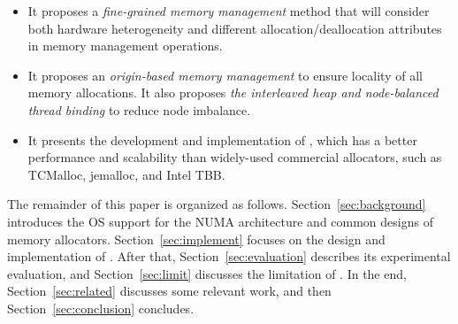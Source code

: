 \begin{itemize}

\item It proposes a \textit{fine-grained memory management} method that will consider both hardware heterogeneity and different allocation/deallocation attributes in memory management operations.

\item It proposes an \textit{origin-based memory management} to ensure locality of all memory allocations. It also proposes \textit{the interleaved heap and node-balanced thread binding} to reduce node imbalance.

\item It presents the development and implementation of \NM{}, which has a better performance and scalability than widely-used commercial allocators, such as TCMalloc, jemalloc, and Intel TBB. 

\end{itemize}

The remainder of this paper is organized as follows. Section~\ref{sec:background} introduces the OS support for the NUMA architecture and common designs of memory allocators. Section~\ref{sec:implement} focuses on the design and implementation of \NM{}. After that, Section~\ref{sec:evaluation} describes its experimental evaluation, and Section~\ref{sec:limit} discusses the limitation of \NM{}. In the end, Section~\ref{sec:related} discusses some relevant work, and then Section~\ref{sec:conclusion} concludes. 